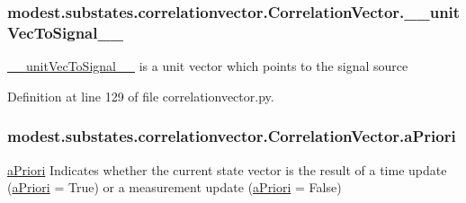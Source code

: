 \subsubsection[{\texorpdfstring{\+\_\+\+\_\+unit\+Vec\+To\+Signal\+\_\+\+\_\+}{__unitVecToSignal__}}]{\setlength{\rightskip}{0pt plus 5cm}modest.\+substates.\+correlationvector.\+Correlation\+Vector.\+\_\+\+\_\+unit\+Vec\+To\+Signal\+\_\+\+\_\+\hspace{0.3cm}{\ttfamily [private]}}\hypertarget{classmodest_1_1substates_1_1correlationvector_1_1CorrelationVector_a4a6aacd90c573941e4f097a034bdb76c}{}\label{classmodest_1_1substates_1_1correlationvector_1_1CorrelationVector_a4a6aacd90c573941e4f097a034bdb76c}


\hyperlink{classmodest_1_1substates_1_1correlationvector_1_1CorrelationVector_a4a6aacd90c573941e4f097a034bdb76c}{\+\_\+\+\_\+unit\+Vec\+To\+Signal\+\_\+\+\_\+} is a unit vector which points to the signal source 



Definition at line 129 of file correlationvector.\+py.

\subsubsection[{\texorpdfstring{a\+Priori}{aPriori}}]{\setlength{\rightskip}{0pt plus 5cm}modest.\+substates.\+correlationvector.\+Correlation\+Vector.\+a\+Priori}\hypertarget{classmodest_1_1substates_1_1correlationvector_1_1CorrelationVector_a9af2ca612576e52c84e98757e53085a8}{}\label{classmodest_1_1substates_1_1correlationvector_1_1CorrelationVector_a9af2ca612576e52c84e98757e53085a8}


\hyperlink{classmodest_1_1substates_1_1correlationvector_1_1CorrelationVector_a9af2ca612576e52c84e98757e53085a8}{a\+Priori} Indicates whether the current state vector is the result of a time update (\hyperlink{classmodest_1_1substates_1_1correlationvector_1_1CorrelationVector_a9af2ca612576e52c84e98757e53085a8}{a\+Priori} = True) or a measurement update (\hyperlink{classmodest_1_1substates_1_1correlationvector_1_1CorrelationVector_a9af2ca612576e52c84e98757e53085a8}{a\+Priori} = False) 



